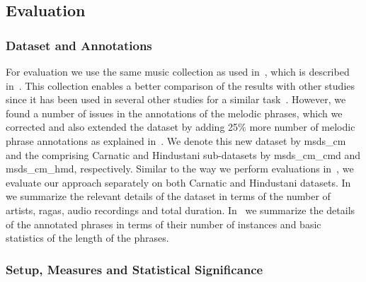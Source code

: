 \subsection{Evaluation}
\label{sec:patterns_improving_similarity_evaluation}

\subsubsection{Dataset and Annotations}
\label{sec:patterns_improving_similarity_dataset_and_annotations}

For evaluation we use the same music collection as used in~, which is described in~. This collection enables a better comparison of the results with other studies since it has been used in several other studies for a similar task~\citep{Rao2014,Ross2012b}. However, we found a number of issues in the annotations of the melodic phrases, which we corrected and also extended the dataset by adding 25\% more number of melodic phrase annotations as explained in~. We denote this new dataset by \acrshort{msds_cm} and the comprising Carnatic and Hindustani sub-datasets by \acrshort{msds_cm_cmd} and \acrshort{msds_cm_hmd}, respectively. Similar to the way we perform evaluations in~, we evaluate our approach separately on both Carnatic and Hindustani datasets. In~ we summarize the relevant details of the dataset in terms of the number of artists, \glspl{raga}, audio recordings and total duration. In~ we summarize the details of the annotated phrases in terms of their number of instances and basic statistics of the length of the phrases.


\subsubsection{Setup, Measures and Statistical Significance}
\label{sec:patterns_improving_similarity_experimental_setup}

